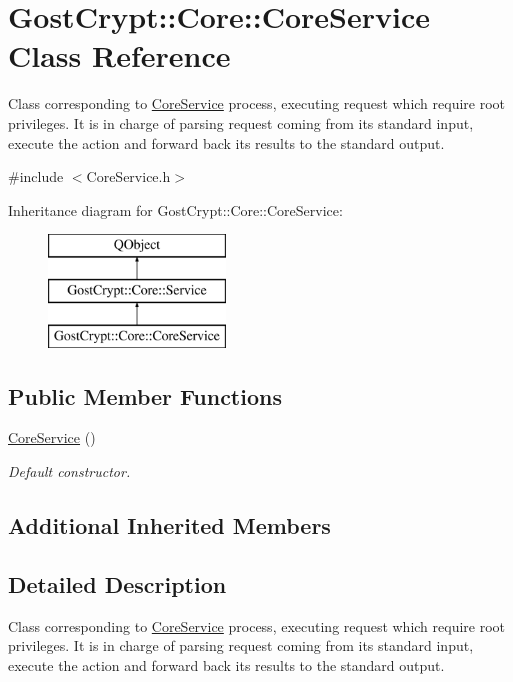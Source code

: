 \hypertarget{class_gost_crypt_1_1_core_1_1_core_service}{}\section{Gost\+Crypt\+:\+:Core\+:\+:Core\+Service Class Reference}
\label{class_gost_crypt_1_1_core_1_1_core_service}


Class corresponding to \hyperlink{class_gost_crypt_1_1_core_1_1_core_service}{Core\+Service} process, executing request which require root privileges. It is in charge of parsing request coming from its standard input, execute the action and forward back its results to the standard output.  




{\ttfamily \#include $<$Core\+Service.\+h$>$}

Inheritance diagram for Gost\+Crypt\+:\+:Core\+:\+:Core\+Service\+:\begin{figure}[H]
\begin{center}
\leavevmode
\includegraphics[height=3.000000cm]{class_gost_crypt_1_1_core_1_1_core_service}
\end{center}
\end{figure}
\subsection*{Public Member Functions}
\begin{DoxyCompactItemize}
\item 
\hyperlink{class_gost_crypt_1_1_core_1_1_core_service_a80d73796811b735b24116d111c616e31}{Core\+Service} ()
\begin{DoxyCompactList}\small\item\em Default constructor. \end{DoxyCompactList}\end{DoxyCompactItemize}
\subsection*{Additional Inherited Members}


\subsection{Detailed Description}
Class corresponding to \hyperlink{class_gost_crypt_1_1_core_1_1_core_service}{Core\+Service} process, executing request which require root privileges. It is in charge of parsing request coming from its standard input, execute the action and forward back its results to the standard output. 

